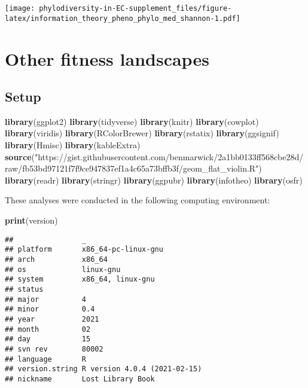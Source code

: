 \documentclass[]{book}
\newenvironment{Shaded}{\begin{snugshade}}{\end{snugshade}}
\newcommand{\KeywordTok}[1]{\textcolor[rgb]{0.13,0.29,0.53}{\textbf{#1}}}
\newcommand{\NormalTok}[1]{#1}
\newcommand{\StringTok}[1]{\textcolor[rgb]{0.31,0.60,0.02}{#1}}
\begin{document}
\texttt{[image: phylodiversity-in-EC-supplement\_files/figure-latex/information\_theory\_pheno\_phylo\_med\_shannon-1.pdf]}

\hypertarget{other-fitness-landscapes}{%
\chapter{Other fitness landscapes}\label{other-fitness-landscapes}}

\hypertarget{setup-1}{%
\section{Setup}\label{setup-1}}

\begin{Shaded}
\begin{Highlighting}[]
\KeywordTok{library}\NormalTok{(ggplot2)}
\KeywordTok{library}\NormalTok{(tidyverse)}
\KeywordTok{library}\NormalTok{(knitr)}
\KeywordTok{library}\NormalTok{(cowplot)}
\KeywordTok{library}\NormalTok{(viridis)}
\KeywordTok{library}\NormalTok{(RColorBrewer)}
\KeywordTok{library}\NormalTok{(rstatix)}
\KeywordTok{library}\NormalTok{(ggsignif)}
\KeywordTok{library}\NormalTok{(Hmisc)}
\KeywordTok{library}\NormalTok{(kableExtra)}
\KeywordTok{source}\NormalTok{(}\StringTok{"https://gist.githubusercontent.com/benmarwick/2a1bb0133ff568cbe28d/raw/fb53bd97121f7f9ce947837ef1a4c65a73bffb3f/geom_flat_violin.R"}\NormalTok{)}
\KeywordTok{library}\NormalTok{(readr)}
\KeywordTok{library}\NormalTok{(stringr)}
\KeywordTok{library}\NormalTok{(ggpubr)}
\KeywordTok{library}\NormalTok{(infotheo)}
\KeywordTok{library}\NormalTok{(osfr)}
\end{Highlighting}
\end{Shaded}

These analyses were conducted in the following computing environment:

\begin{Shaded}
\begin{Highlighting}[]
\KeywordTok{print}\NormalTok{(version)}
\end{Highlighting}
\end{Shaded}

\begin{verbatim}
##                _                           
## platform       x86_64-pc-linux-gnu         
## arch           x86_64                      
## os             linux-gnu                   
## system         x86_64, linux-gnu           
## status                                     
## major          4                           
## minor          0.4                         
## year           2021                        
## month          02                          
## day            15                          
## svn rev        80002                       
## language       R                           
## version.string R version 4.0.4 (2021-02-15)
## nickname       Lost Library Book
\end{verbatim}
\end{document}
